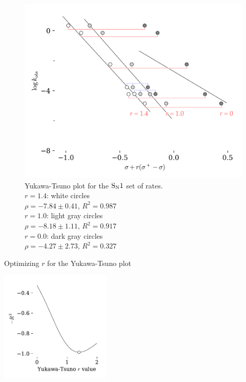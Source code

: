 \documentclass{tufte-handout}
\begin{document}
\begin{figure}[h!]
  \centering
  \includegraphics[scale=0.8]{images/plot10_multiR.png}
  \caption[-5mm]{Yukawa-Tsuno plot for the $\rm S_N1$ set of rates.   \vspace{2mm} \\
  {$r = 1.4$}: white circles  \\
  \hspace{3mm} $\rho = -7.84 \pm 0.41$, $R^2 = 0.987$ \vspace{2mm} \\
  {$r = 1.0$}: light gray circles  \\
  \hspace{3mm} $\rho = -8.18 \pm 1.11$, $R^2 = 0.917$ \vspace{2mm} \\
  {$r = 0.0$}: dark gray circles  \\
  \hspace{3mm} $\rho = -4.27 \pm 2.73$, $R^2 = 0.327$ \vspace{2mm} \\

   
 } 
  \label{fig:YK4}
\end{figure}

\begin{marginfigure}[-25mm]
  \centering
    \caption[-0mm]{Optimizing $r$ for the Yukawa-Tsuno plot \label{fig:YK4R}}  
    \includegraphics[width=150pt]{images/plot10R.pdf}
\end{marginfigure}
\end{document}
